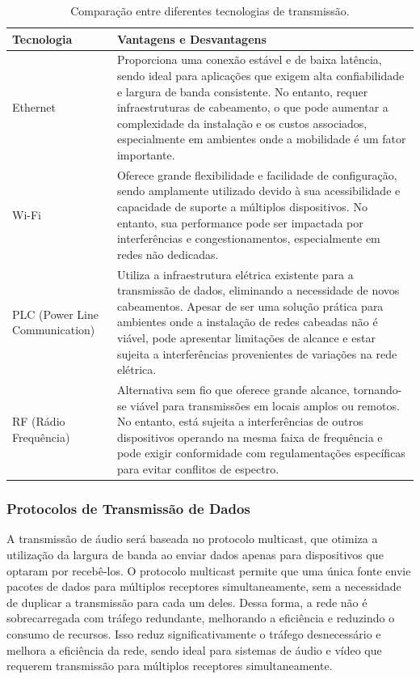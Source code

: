 \documentclass{article}
\begin{document}
\begin{table}[h]
    \centering
    \begin{tabular}{@{}l p{10cm}@{}}
        \toprule
        \textbf{Tecnologia} & \textbf{Vantagens e Desvantagens} \\
        \midrule
        Ethernet & Proporciona uma conexão estável e de baixa latência, sendo ideal para aplicações que exigem alta confiabilidade e largura de banda consistente. No entanto, requer infraestruturas de cabeamento, o que pode aumentar a complexidade da instalação e os custos associados, especialmente em ambientes onde a mobilidade é um fator importante. \\
        Wi-Fi & Oferece grande flexibilidade e facilidade de configuração, sendo amplamente utilizado devido à sua acessibilidade e capacidade de suporte a múltiplos dispositivos. No entanto, sua performance pode ser impactada por interferências e congestionamentos, especialmente em redes não dedicadas. \\
        PLC (Power Line Communication) & Utiliza a infraestrutura elétrica existente para a transmissão de dados, eliminando a necessidade de novos cabeamentos. Apesar de ser uma solução prática para ambientes onde a instalação de redes cabeadas não é viável, pode apresentar limitações de alcance e estar sujeita a interferências provenientes de variações na rede elétrica. \\
        RF (Rádio Frequência) & Alternativa sem fio que oferece grande alcance, tornando-se viável para transmissões em locais amplos ou remotos. No entanto, está sujeita a interferências de outros dispositivos operando na mesma faixa de frequência e pode exigir conformidade com regulamentações específicas para evitar conflitos de espectro. \\
        \bottomrule
    \end{tabular}
    \caption{Comparação entre diferentes tecnologias de transmissão.}
    \label{tab:tecnologias_comparacao}
\end{table}


\subsubsection{Protocolos de Transmissão de Dados}
A transmissão de áudio será baseada no protocolo multicast, que otimiza a utilização da largura de banda ao enviar dados apenas para dispositivos que optaram por recebê-los. O protocolo multicast permite que uma única fonte envie pacotes de dados para múltiplos receptores simultaneamente, sem a necessidade de duplicar a transmissão para cada um deles. Dessa forma, a rede não é sobrecarregada com tráfego redundante, melhorando a eficiência e reduzindo o consumo de recursos. Isso reduz significativamente o tráfego desnecessário e melhora a eficiência da rede, sendo ideal para sistemas de áudio e vídeo que requerem transmissão para múltiplos receptores simultaneamente.
\end{document}
